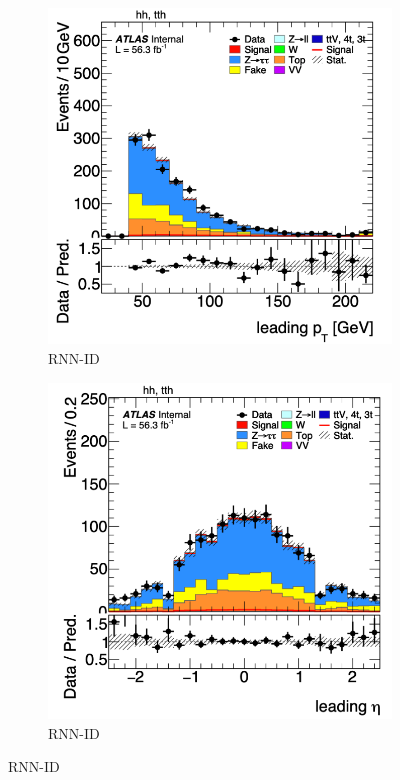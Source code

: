 \begin{figure}[htbp]
  \begin{subfigure}[b]{0.45\textwidth}
      \centering
      \includegraphics[width=\textwidth]{images/leading_pt_rnn.png}
      \caption{RNN-ID}
  \end{subfigure}
  \begin{subfigure}[b]{0.45\textwidth}
      \centering
      \includegraphics[width=\textwidth]{images/leading_eta_rnn.png}
      \caption{RNN-ID}
  \end{subfigure}


\end{figure}
